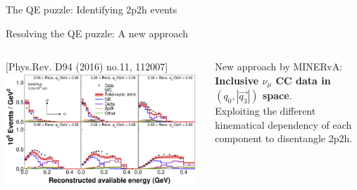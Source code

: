 \begin{frame}{The QE puzzle: Identifying 2p2h events}
\end{frame}


%
%
%
\begin{frame}{Resolving the QE puzzle: A new approach}


  \begin{columns}
    \begin{column}{0.70\textwidth}
      \begin{center}
        {\tiny [Phys.Rev. D94 (2016) no.11, 112007]}\\
         \includegraphics[width=0.98\textwidth]{./images/nuint/ccqe/minerva_q0q3.png}\\
      \end{center}
    \end{column}
    \begin{column}{0.30\textwidth}
      {\scriptsize
        New approach by MINERvA:\\
        {\bf Inclusive $\nu_{\mu}$ CC data
        in $(q_0, |\vec{q_3}|)$ space}.\\
        Exploiting the different kinematical dependency
        of each component to disentangle 2p2h.\\
      }
    \end{column}
  \end{columns}


\end{frame}
